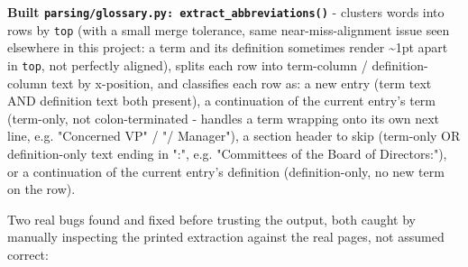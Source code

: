 \textbf{Built \texttt{parsing/\allowbreak{}glossary.py: extract\_\allowbreak{}abbreviations()}} - clusters words into rows by \texttt{top} (with a small merge tolerance, same near-miss-alignment issue seen elsewhere in this project: a term and its definition sometimes render \textasciitilde{}1pt apart in \texttt{top}, not perfectly aligned), splits each row into term-column / definition-column text by x-position, and classifies each row as: a new entry (term text AND definition text both present), a continuation of the current entry's term (term-only, not colon-terminated - handles a term wrapping onto its own next line, e.g. "Concerned VP" / "/ Manager"), a section header to skip (term-only OR definition-only text ending in ":", e.g. "Committees of the Board of Directors:"), or a continuation of the current entry's definition (definition-only, no new term on the row).

Two real bugs found and fixed before trusting the output, both caught by manually inspecting the printed extraction against the real pages, not assumed correct:


